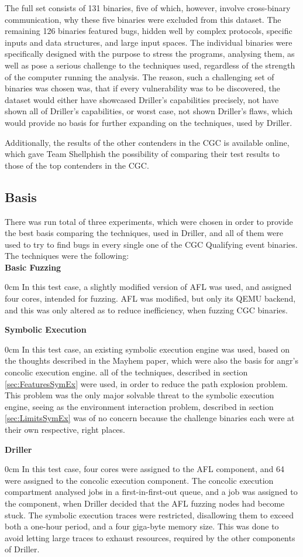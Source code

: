 \documentclass[a4paper]{article}
\newcommand{\tbf}[1]{\textbf{#1}}
\newcommand{\marginwidth}{0.5cm}
\newcommand{\subsubsubsection}[1]{\tbf{#1}\begin{addmargin}[\marginwidth]{0cm}}
\begin{document}
The full set consists of 131 binaries, five of which, however, involve cross-binary communication, why these five binaries were excluded from this dataset. The remaining 126 binaries featured bugs, hidden well by complex protocols, specific inputs and data structures, and large input spaces. The individual binaries were specifically designed with the purpose to stress the programs, analysing them, as well as pose a serious challenge to the techniques used, regardless of the strength of the computer running the analysis. The reason, such a challenging set of binaries was chosen was, that if every vulnerability was to be discovered, the dataset would either have showcased Driller's capabilities precisely, not have shown all of Driller's capabilities, or worst case, not shown Driller's flaws, which would provide no basis for further expanding on the techniques, used by Driller. 

Additionally, the results of the other contenders in the CGC is available online, which gave Team Shellphish the possibility of comparing their test results to those of the top contenders in the CGC.
\subsection{Basis}
\label{sec:Basis}
There was run total of three experiments, which were chosen in order to provide the best basis comparing the techniques, used in Driller, and all of them were used to try to find bugs in every single one of the CGC Qualifying event binaries. The techniques were the following:\\
\subsubsubsection{Basic Fuzzing}
In this test case, a slightly modified version of AFL was used, and assigned four cores, intended for fuzzing. AFL was modified, but only its QEMU backend, and this was only altered as to reduce inefficiency, when fuzzing CGC binaries. 
\end{addmargin}
\subsubsubsection{Symbolic Execution}
In this test case, an existing symbolic execution engine was used, based on the thoughts described in the Mayhem paper\cite{Mayhem}, which were also the basis for angr's concolic execution engine. all of the techniques, described in section \ref{sec:FeaturesSymEx} were used, in order to reduce the path explosion problem. This problem was the only major solvable threat to the symbolic execution engine, seeing as the environment interaction problem, described in section \ref{sec:LimitsSymEx} was of no concern because the challenge binaries each were at their own respective, right places.
\end{addmargin}
\subsubsubsection{Driller}
In this test case, four cores were assigned to the AFL component, and 64 were assigned to the concolic execution component. The concolic execution compartment analysed jobs in a first-in-first-out queue, and a job was assigned to the component, when Driller decided that the AFL fuzzing nodes had become stuck. The symbolic execution traces were restricted, disallowing them to exceed both a one-hour period, and a four giga-byte memory size. This was done to avoid letting large traces to exhaust resources, required by the other components of Driller.
\end{addmargin}
\end{document}
